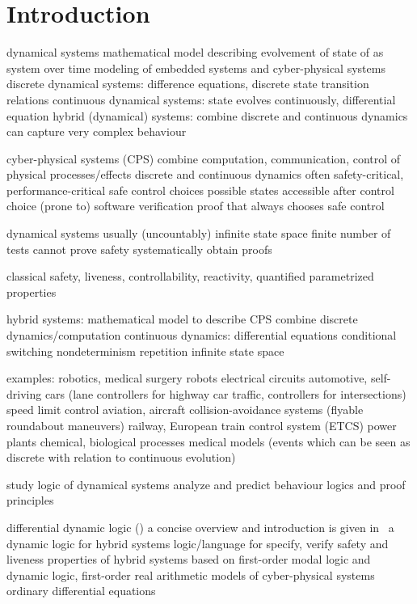 \chapter{Introduction}

	dynamical systems
	mathematical model
	describing evolvement of state of as system over time
	modeling of embedded systems and cyber-physical systems
    discrete dynamical systems: difference equations, discrete state transition relations
    continuous dynamical systems: state evolves continuously, differential equation
    hybrid (dynamical) systems: combine discrete and continuous dynamics
    can capture very complex behaviour


	cyber-physical systems (CPS)
	combine computation, communication, control of physical processes/effects
	discrete and continuous dynamics
	often safety-critical, performance-critical
    safe control choices
    possible states accessible after control choice
	(prone to) software verification
    proof that always chooses safe control

    dynamical systems usually (uncountably) infinite state space
    finite number of tests cannot prove safety
    systematically obtain proofs

    classical safety, liveness, controllability, reactivity, quantified parametrized properties

	hybrid systems: mathematical model to describe CPS
	combine discrete dynamics/computation
	continuous dynamics: differential equations
    conditional switching
    nondeterminism
    repetition
	infinite state space

	examples:
    robotics, medical surgery robots
    electrical circuits
	automotive, self-driving cars (lane controllers for highway car traffic, controllers for intersections)
    speed limit control
	aviation, aircraft collision-avoidance systems (flyable roundabout maneuvers)
	railway, European train control system (ETCS)
    power plants
    chemical, biological processes
    medical models (events which can be seen as discrete with relation to continuous evolution)

	study logic of dynamical systems
    analyze and predict behaviour
    logics and proof principles

    differential dynamic logic (\dL)
    a concise overview and introduction is given in~\cite{Platzer12LogicsDynSys}
    a dynamic logic for hybrid systems
    logic/language for specify, verify safety and liveness properties
    of hybrid systems
    based on first-order modal logic and dynamic logic, first-order real arithmetic
    models of cyber-physical systems
    ordinary differential equations

